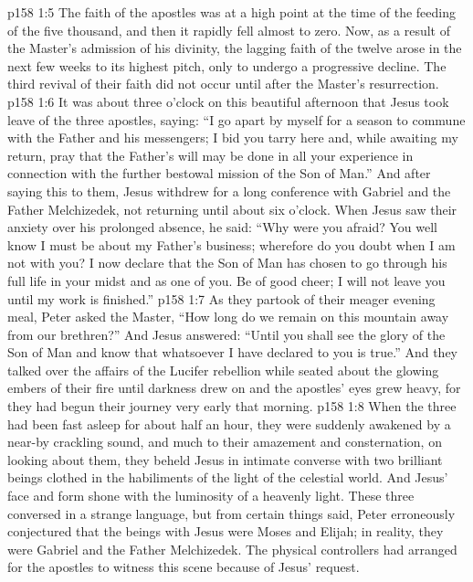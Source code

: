 \vs p158 1:5 The faith of the apostles was at a high point at the time of the feeding of the five thousand, and then it rapidly fell almost to zero. Now, as a result of the Master’s admission of his divinity, the lagging faith of the twelve arose in the next few weeks to its highest pitch, only to undergo a progressive decline. The third revival of their faith did not occur until after the Master’s resurrection.
\vs p158 1:6 It was about three o’clock on this beautiful afternoon that Jesus took leave of the three apostles, saying: \textcolor{ubdarkred}{“I go apart by myself for a season to commune with the Father and his messengers; I bid you tarry here and, while awaiting my return, pray that the Father’s will may be done in all your experience in connection with the further bestowal mission of the Son of Man.”} And after saying this to them, Jesus withdrew for a long conference with Gabriel and the Father Melchizedek, not returning until about six o’clock. When Jesus saw their anxiety over his prolonged absence, he said: \textcolor{ubdarkred}{“Why were you afraid? You well know I must be about my Father’s business; wherefore do you doubt when I am not with you? I now declare that the Son of Man has chosen to go through his full life in your midst and as one of you. Be of good cheer; I will not leave you until my work is finished.”}
\vs p158 1:7 As they partook of their meager evening meal, Peter asked the Master, “How long do we remain on this mountain away from our brethren?” And Jesus answered: \textcolor{ubdarkred}{“Until you shall see the glory of the Son of Man and know that whatsoever I have declared to you is true.”} And they talked over the affairs of the Lucifer rebellion while seated about the glowing embers of their fire until darkness drew on and the apostles’ eyes grew heavy, for they had begun their journey very early that morning.
\vs p158 1:8 When the three had been fast asleep for about half an hour, they were suddenly awakened by a near\hyp{}by crackling sound, and much to their amazement and consternation, on looking about them, they beheld Jesus in intimate converse with two brilliant beings clothed in the habiliments of the light of the celestial world. And Jesus’ face and form shone with the luminosity of a heavenly light. These three conversed in a strange language, but from certain things said, Peter erroneously conjectured that the beings with Jesus were Moses and Elijah; in reality, they were Gabriel and the Father Melchizedek. The physical controllers had arranged for the apostles to witness this scene because of Jesus’ request.
